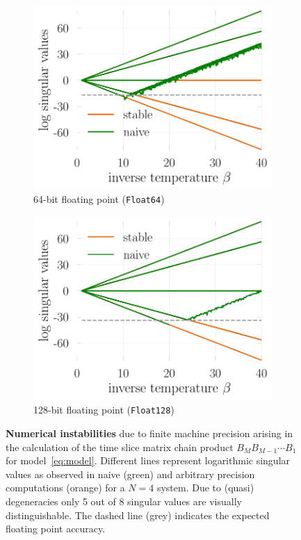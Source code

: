\documentclass[submission, Phys]{SciPost}
\begin{document}
\begin{figure}
	\centering
	\begin{subfigure}{0.48\textwidth}
		\includegraphics[width=\textwidth]{figures/naive_vs_stable.pdf}
		\caption{64-bit floating point (\texttt{Float64}) \label{fig:naive_vs_stable_float64}}
	\end{subfigure}%
	\hspace{10pt}
	\begin{subfigure}{0.48\textwidth}
		\includegraphics[width=\textwidth]{figures/naive_vs_stable_float128.pdf}
		\caption{128-bit floating point (\texttt{Float128}) \label{fig:naive_vs_stable_float128}}
	\end{subfigure}
	\vspace{5pt}
	\caption[MyCaption]{\textbf{Numerical instabilities} due to finite machine precision arising in the calculation of the time slice matrix chain product $B_M B_{M-1} \cdots B_1$ for model~\eqref{eq:model}. Different lines represent logarithmic singular values as observed in naive (green) and arbitrary precision computations (orange) for a $N=4$ system. Due to (quasi) degeneracies only 5 out of 8 singular values are visually distinguishable. The dashed line (grey) indicates the expected floating point accuracy\protect\footnotemark.}
	\label{fig:naive_vs_stable}
\end{figure}
\end{document}
